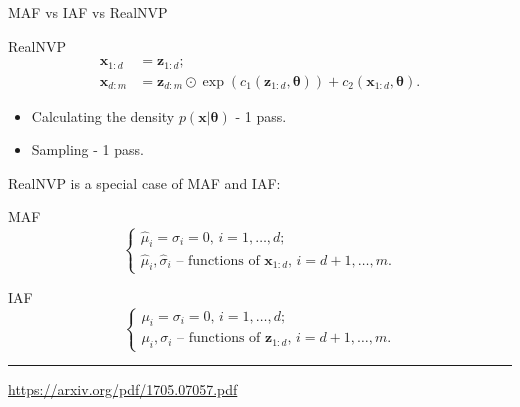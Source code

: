 \documentclass{beamer}
\newcommand{\bx}{\mathbf{x}}
\newcommand{\bz}{\mathbf{z}}
\newcommand{\btheta}{\boldsymbol{\theta}}
\begin{document}
\begin{frame}{MAF vs IAF vs RealNVP}
	\begin{block}{RealNVP}
		\vspace{-0.7cm}
		\begin{align*}
			\bx_{1:d} &= \bz_{1:d}; \\ \bx_{d:m} &= \bz_{d:m} \odot \exp \left(c_1(\bz_{1:d}, \btheta)\right) + c_2(\bx_{1:d}, \btheta).
		\end{align*}
		\vspace{-0.8cm}
	\end{block}
	\begin{itemize}
		\item Calculating the density $p(\bx | \btheta)$ - 1 pass.
		\item Sampling - 1 pass.
	\end{itemize}

	RealNVP is a special case of MAF and IAF:
	\begin{block}{MAF}
		\vspace{-0.5cm}
		\begin{equation*}
			\begin{cases}
				\hat{\mu}_i  = \hat{\sigma}_i = 0, \, i = 1, \dots, d; \\
				\hat{\mu}_i, \hat{\sigma}_i \text{ -- functions of } \bx_{1:d}, \, i = d+1, \dots, m.
			\end{cases}
		\end{equation*}
		\vspace{-0.3cm}
	\end{block}
	\begin{block}{IAF}
		\vspace{-0.3cm}
		\begin{equation*}
			\begin{cases}
				\mu_i  = \sigma_i = 0, \, i = 1, \dots, d; \\
				\mu_i, \sigma_i \text{ -- functions of } \bz_{1:d}, \, i = d+1, \dots, m.
			\end{cases}
		\end{equation*}
	\end{block}
	\vfill
	\hrule\medskip
	{\scriptsize \href{https://arxiv.org/pdf/1705.07057.pdf}{https://arxiv.org/pdf/1705.07057.pdf}} 
\end{frame}
\end{document}
